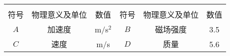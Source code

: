 \begin{thesissymboltable}
\begin{longtable}{ccc||ccc}
    \multicolumn{3}{c}{} & \multicolumn{3}{c}{} \\
    符号 & 物理意义及单位 & 数值 & 符号 & 物理意义及单位 & 数值 \\[1cm]
    $A$ & 加速度 & m/s$^2$ & $B$ & 磁场强度 & 3.5 \\
    $C$ & 速度 & m/s & $D$ & 质量 & 5.6 \\
\end{longtable}
\setcounter{table}{0}
\end{thesissymboltable}